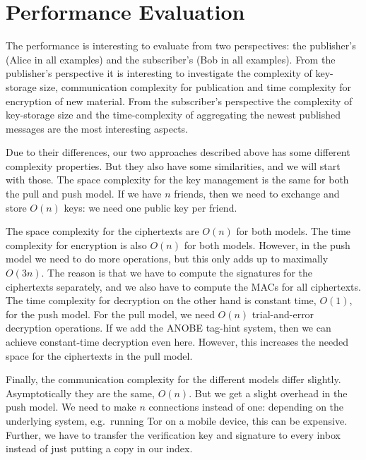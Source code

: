 \section{Performance Evaluation}\label{sec:PerformanceEvaluation}

The performance is interesting to evaluate from two perspectives: the 
publisher's (Alice in all examples) and the subscriber's (Bob in all examples).
From the publisher's perspective it is interesting to investigate the 
complexity of key-storage size, communication complexity for publication and 
time complexity for encryption of new material.
From the subscriber's perspective the complexity of key-storage size and the 
time-complexity of aggregating the newest published messages are the most 
interesting aspects.

Due to their differences, our two approaches described above has some different 
complexity properties.
But they also have some similarities, and we will start with those.
The space complexity for the key management is the same for both the pull and 
push model.
If we have \(n\) friends, then we need to exchange and store \(O(n)\) keys:
we need one public key per friend.

The space complexity for the ciphertexts are \(O(n)\) for both models.
The time complexity for encryption is also \(O(n)\) for both models.
However, in the push model we need to do more operations, but this only adds up 
to maximally \(O(3n)\).
The reason is that we have to compute the signatures for the ciphertexts 
separately, and we also have to compute the \acp{MAC} for all ciphertexts.
The time complexity for decryption on the other hand is constant time, 
\(O(1)\), for the push model.
For the pull model, we need \(O(n)\) trial-and-error decryption operations.
If we add the \ac{ANOBE} tag-hint system, then we can achieve constant-time 
decryption even here.
However, this increases the needed space for the ciphertexts in the pull model.

Finally, the communication complexity for the different models differ slightly.
Asymptotically they are the same, \(O(n)\).
But we get a slight overhead in the push model.
We need to make \(n\) connections instead of one: depending on the underlying 
system, e.g.\ running Tor on a mobile device, this can be expensive.
Further, we have to transfer the verification key and signature to every inbox 
instead of just putting a copy in our index.


